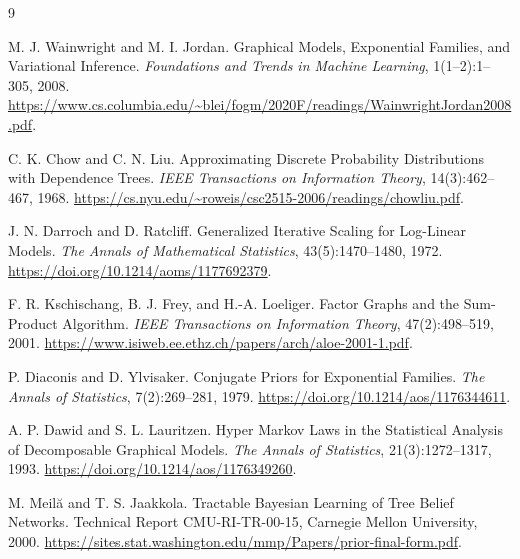 \documentclass[11pt]{article}
\newcommand{\1}{\mathbf 1}
\begin{document}
\begin{thebibliography}{9}

M. J. Wainwright and M. I. Jordan.
\newblock Graphical Models, Exponential Families, and Variational Inference.
\newblock \emph{Foundations and Trends in Machine Learning}, 1(1--2):1--305,
2008.
\newblock \url{https://www.cs.columbia.edu/~blei/fogm/2020F/readings/WainwrightJordan2008.pdf}.

C. K. Chow and C. N. Liu.
\newblock Approximating Discrete Probability Distributions with Dependence Trees.
\newblock \emph{IEEE Transactions on Information Theory}, 14(3):462--467, 1968.
\newblock \url{https://cs.nyu.edu/~roweis/csc2515-2006/readings/chowliu.pdf}.

J. N. Darroch and D. Ratcliff.
\newblock Generalized Iterative Scaling for Log-Linear Models.
\newblock \emph{The Annals of Mathematical Statistics}, 43(5):1470--1480,
1972.
\newblock \url{https://doi.org/10.1214/aoms/1177692379}.

F. R. Kschischang, B. J. Frey, and H.-A. Loeliger.
\newblock Factor Graphs and the Sum-Product Algorithm.
\newblock \emph{IEEE Transactions on Information Theory}, 47(2):498--519,
2001.
\newblock \url{https://www.isiweb.ee.ethz.ch/papers/arch/aloe-2001-1.pdf}.

P. Diaconis and D. Ylvisaker.
\newblock Conjugate Priors for Exponential Families.
\newblock \emph{The Annals of Statistics}, 7(2):269--281, 1979.
\newblock \url{https://doi.org/10.1214/aos/1176344611}.

A. P. Dawid and S. L. Lauritzen.
\newblock Hyper Markov Laws in the Statistical Analysis of Decomposable
Graphical Models.
\newblock \emph{The Annals of Statistics}, 21(3):1272--1317, 1993.
\newblock \url{https://doi.org/10.1214/aos/1176349260}.

M. Meil\u{a} and T. S. Jaakkola.
\newblock Tractable Bayesian Learning of Tree Belief Networks.
\newblock Technical Report CMU-RI-TR-00-15, Carnegie Mellon University, 2000.
\newblock \url{https://sites.stat.washington.edu/mmp/Papers/prior-final-form.pdf}.

\end{thebibliography}
\end{document}
